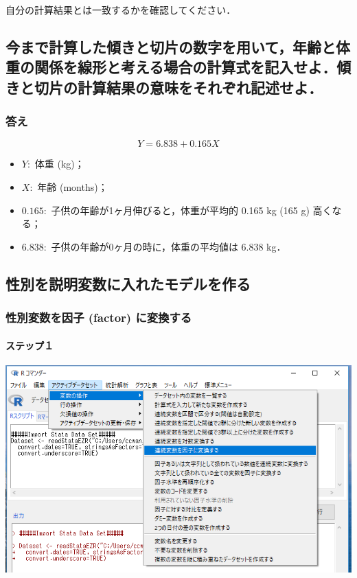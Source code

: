 \documentclass[11pt,]{problemset}
\providecommand{\tightlist}{%
  \setlength{\itemsep}{0pt}\setlength{\parskip}{0pt}}
\let\oldparagraph\paragraph
\renewcommand{\paragraph}[1]{\oldparagraph{#1}\mbox{}}
\begin{document}
自分の計算結果とは一致するかを確認してください．

\hypertarget{section-15}{%
\subsection{今まで計算した傾きと切片の数字を用いて，年齢と体重の関係を線形と考える場合の計算式を記入せよ．傾きと切片の計算結果の意味をそれぞれ記述せよ．}\label{section-15}}

\hypertarget{section-16}{%
\subsubsection{答え}\label{section-16}}

\[
Y = 6.838 + 0.165 X
\]

\begin{itemize}
\tightlist
\item
  \(Y:\) 体重 (kg)；
\item
  \(X:\) 年齢 (months)；
\item
  \(0.165:\) 子供の年齢が1ヶ月伸びると，体重が平均的 0.165 kg (165 g)
  高くなる；
\item
  \(6.838:\) 子供の年齢が0ヶ月の時に，体重の平均値は 6.838 kg．
\end{itemize}

\newpage
\vfill

\hypertarget{section-17}{%
\subsection{性別を説明変数に入れたモデルを作る}\label{section-17}}

\hypertarget{factor-}{%
\subsubsection{性別変数を因子 (factor) に変換する}\label{factor-}}

\hypertarget{section-18}{%
\paragraph{ステップ１}\label{section-18}}

\begin{center}\includegraphics[width=0.8\linewidth]{pic/sexfactor00} \end{center}
\end{document}
